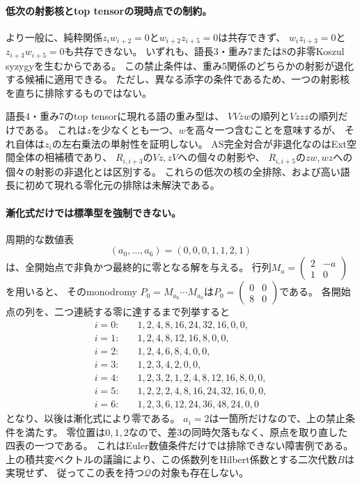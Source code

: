 \documentclass[11pt,a4paper]{ltjsarticle}
\begin{document}
\paragraph{低次の射影核とtop tensorの現時点での制約。}
より一般に、純粋関係$z_iw_{i+2}=0$と$w_{i+2}z_{i+5}=0$は共存できず、
$w_iz_{i+3}=0$と$z_{i+3}w_{i+5}=0$も共存できない。
いずれも、語長3・重み7または8の非零Koszul syzygyを生むからである。
この禁止条件は、重み5関係のどちらかの射影が退化する候補に適用できる。
ただし、異なる添字の条件であるため、一つの射影核を直ちに排除するものではない。

語長4・重み7のtop tensorに現れる語の重み型は、
$VVzw$の順列と$Vzzz$の順列だけである。
これは$z$を少なくとも一つ、$w$を高々一つ含むことを意味するが、
それ自体は$z_i$の左右乗法の単射性を証明しない。
AS完全対合が非退化なのはExt空間全体の相補積であり、
$R_{i,i+3}$の$Vz,zV$への個々の射影や、
$R_{i,i+5}$の$zw,wz$への個々の射影の非退化とは区別する。
これらの低次の核の全排除、および高い語長に初めて現れる零化元の排除は未解決である。

\paragraph{漸化式だけでは標準型を強制できない。}
周期的な数値表
\[
(a_0,\ldots,a_6)=(0,0,0,1,1,2,1)
\]
は、全開始点で非負かつ最終的に零となる解を与える。
行列$M_a=\left(\begin{smallmatrix}2&-a\\1&0\end{smallmatrix}\right)$を用いると、
そのmonodromy $P_0=M_{a_6}\cdots M_{a_0}$は$P_0=\left(\begin{smallmatrix}0&0\\8&0\end{smallmatrix}\right)$である。
各開始点の列を、二つ連続する零に達するまで列挙すると
\begin{align*}
i=0:&\quad1,2,4,8,16,24,32,16,0,0,\\
i=1:&\quad1,2,4,8,12,16,8,0,0,\\
i=2:&\quad1,2,4,6,8,4,0,0,\\
i=3:&\quad1,2,3,4,2,0,0,\\
i=4:&\quad1,2,3,2,1,2,4,8,12,16,8,0,0,\\
i=5:&\quad1,2,2,2,4,8,16,24,32,16,0,0,\\
i=6:&\quad1,2,3,6,12,24,36,48,24,0,0
\end{align*}
となり、以後は漸化式により零である。
$a_i=2$は一箇所だけなので、上の禁止条件を満たす。
零位置は$0,1,2$なので、差3の同時欠落もなく、原点を取り直した四表の一つである。
これはEuler数値条件だけでは排除できない障害例である。
上の積共変ベクトルの議論により、この係数列をHilbert係数とする二次代数$B$は実現せず、
従ってこの表を持つ$\mathcal Q$の対象も存在しない。
\end{document}
